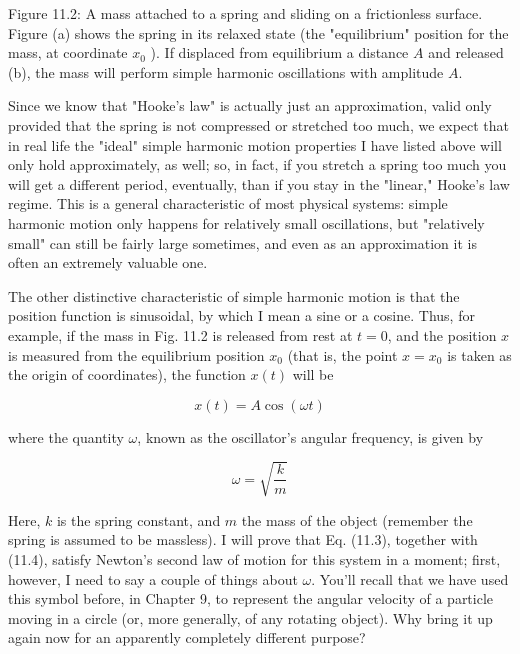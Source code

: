 \documentclass[10pt]{article}
\begin{document}
Figure 11.2: A mass attached to a spring and sliding on a frictionless surface. Figure (a) shows the spring in its relaxed state (the "equilibrium" position for the mass, at coordinate $x_{0}$ ). If displaced from equilibrium a distance $A$ and released (b), the mass will perform simple harmonic oscillations with amplitude $A$.

Since we know that "Hooke's law" is actually just an approximation, valid only provided that the spring is not compressed or stretched too much, we expect that in real life the "ideal" simple harmonic motion properties I have listed above will only hold approximately, as well; so, in fact, if you stretch a spring too much you will get a different period, eventually, than if you stay in the "linear," Hooke's law regime. This is a general characteristic of most physical systems: simple\\
harmonic motion only happens for relatively small oscillations, but "relatively small" can still be fairly large sometimes, and even as an approximation it is often an extremely valuable one.

The other distinctive characteristic of simple harmonic motion is that the position function is sinusoidal, by which I mean a sine or a cosine. Thus, for example, if the mass in Fig. 11.2 is released from rest at $t=0$, and the position $x$ is measured from the equilibrium position $x_{0}$ (that is, the point $x=x_{0}$ is taken as the origin of coordinates), the function $x(t)$ will be


\begin{equation*}
x(t)=A \cos (\omega t) \tag{11.3}
\end{equation*}


where the quantity $\omega$, known as the oscillator's angular frequency, is given by


\begin{equation*}
\omega=\sqrt{\frac{k}{m}} \tag{11.4}
\end{equation*}


Here, $k$ is the spring constant, and $m$ the mass of the object (remember the spring is assumed to be massless). I will prove that Eq. (11.3), together with (11.4), satisfy Newton's second law of motion for this system in a moment; first, however, I need to say a couple of things about $\omega$. You'll recall that we have used this symbol before, in Chapter 9, to represent the angular velocity of a particle moving in a circle (or, more generally, of any rotating object). Why bring it up again now for an apparently completely different purpose?
\end{document}
